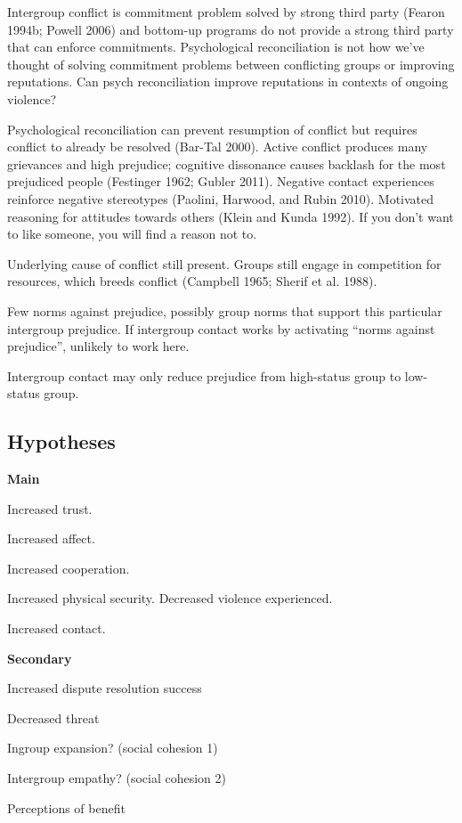 \documentclass[11pt]{article}
\begin{document}
Intergroup conflict is commitment problem solved by strong third party
(Fearon 1994b; Powell 2006) and bottom-up programs do not provide a
strong third party that can enforce commitments. Psychological
reconciliation is not how we've thought of solving commitment problems
between conflicting groups or improving reputations. Can psych
reconciliation improve reputations in contexts of ongoing violence?

Psychological reconciliation can prevent resumption of conflict but
requires conflict to already be resolved (Bar-Tal 2000). Active conflict
produces many grievances and high prejudice; cognitive dissonance causes
backlash for the most prejudiced people (Festinger 1962; Gubler 2011).
Negative contact experiences reinforce negative stereotypes (Paolini,
Harwood, and Rubin 2010). Motivated reasoning for attitudes towards
others (Klein and Kunda 1992). If you don't want to like someone, you
will find a reason not to.

Underlying cause of conflict still present. Groups still engage in
competition for resources, which breeds conflict (Campbell 1965; Sherif
et al. 1988).

Few norms against prejudice, possibly group norms that support this
particular intergroup prejudice. If intergroup contact works by
activating ``norms against prejudice'', unlikely to work here.

Intergroup contact may only reduce prejudice from high-status group to
low-status group.

\subsection{Hypotheses}\label{hypotheses}

\textbf{Main}

Increased trust.

Increased affect.

Increased cooperation.

Increased physical security. Decreased violence experienced.

Increased contact.

\textbf{Secondary}

Increased dispute resolution success

Decreased threat

Ingroup expansion? (social cohesion 1)

Intergroup empathy? (social cohesion 2)

Perceptions of benefit
\end{document}
